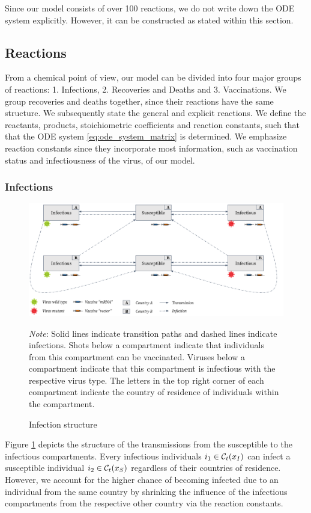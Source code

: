 Since our model consists of over 100 reactions, we do not write down the ODE system explicitly. However, it can be constructed as stated within this section.  
\subsection{Reactions}
From a chemical point of view, our model can be divided into four major groups of reactions: 1. Infections, 2. Recoveries and Deaths and 3. Vaccinations. We group recoveries and deaths together, since their reactions have the same structure. We subsequently state the general and explicit reactions. We define the reactants, products, stoichiometric coefficients and reaction constants, such that that the ODE system \eqref{eq:ode_system_matrix} is determined. We emphasize reaction constants since they incorporate most information, such as vaccination status and infectiousness of the virus, of our model.


\subsubsection{Infections}
\begin{figure}[h!]
\centering
\includegraphics[scale=0.3]{images/overview_infection.png}\\
\begin{flushleft}
\scriptsize{\textit{Note}: Solid lines indicate transition paths and dashed lines indicate infections. Shots below a compartment indicate that individuals from this compartment can be vaccinated. Viruses below a compartment indicate that this compartment is infectious with the respective virus type. The letters in the top right corner of each compartment indicate the country of residence of individuals within the compartment.}
\end{flushleft}
\caption{Infection structure}
\label{fig:model_infections}
\end{figure}
Figure \ref{fig:model_infections} depicts the structure of the transmissions from the susceptible to the infectious compartments. Every infectious individuals $i_1 \in \mathcal{C}_t(x_I)$ can infect a susceptible individual $i_2 \in \mathcal{C}_t(x_S)$ regardless of their countries of residence. However, we account for the higher chance of becoming infected due to an individual from the same country by shrinking the influence of the infectious compartments from the respective other country via the reaction constants. \\

